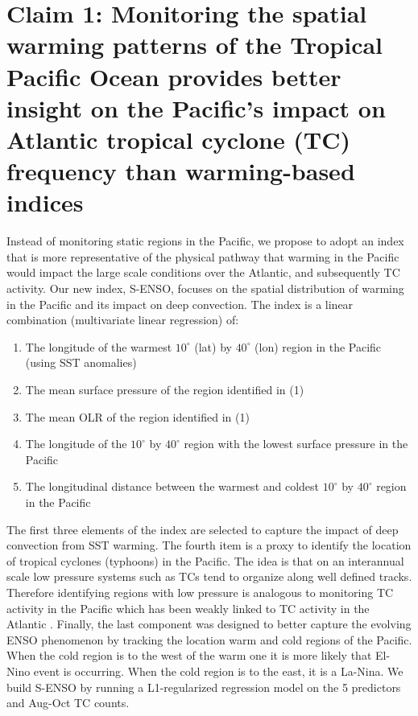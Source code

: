 \section{Claim 1: Monitoring the spatial warming patterns of the Tropical Pacific Ocean provides better insight on the Pacific's impact on Atlantic tropical cyclone (TC) frequency than warming-based indices}

Instead of monitoring static regions in the Pacific, we propose to adopt an index that is more representative of the physical pathway that warming in the Pacific would impact the large scale conditions over the Atlantic, and subsequently TC activity. Our new index, S-ENSO, focuses on the spatial distribution of warming in the Pacific and its impact on deep convection. The index is a linear combination (multivariate linear regression) of:
\begin{enumerate}

	\item The longitude of the warmest $10^\circ$ (lat) by $40^\circ$ (lon) region in the Pacific (using SST anomalies)

	\item The mean surface pressure of the region identified in (1)

	\item The mean OLR of the region identified in (1)

	\item The longitude of the $10^\circ$ by $40^\circ$ region with the lowest surface pressure in the Pacific

	\item The longitudinal distance between the warmest and coldest $10^\circ$ by $40^\circ$ region in the Pacific
\end{enumerate}

The first three elements of the index are selected to capture the impact of deep convection from SST warming. The fourth item is a proxy to identify the location of tropical cyclones (typhoons) in the Pacific. The idea is that on an interannual scale low pressure systems such as TCs tend to organize along well defined tracks. Therefore identifying regions with low pressure is analogous to monitoring TC activity in the Pacific which has been weakly linked to TC activity in the Atlantic \cite{wang2010}. Finally, the last component was designed to better capture the evolving ENSO phenomenon by tracking the location warm and cold regions of the Pacific. When the cold region is to the west of the warm one it is more likely that El-Nino event is occurring. When the cold region is to the east, it is a La-Nina. We build S-ENSO by running a L1-regularized regression model on the 5 predictors and Aug-Oct TC counts.

